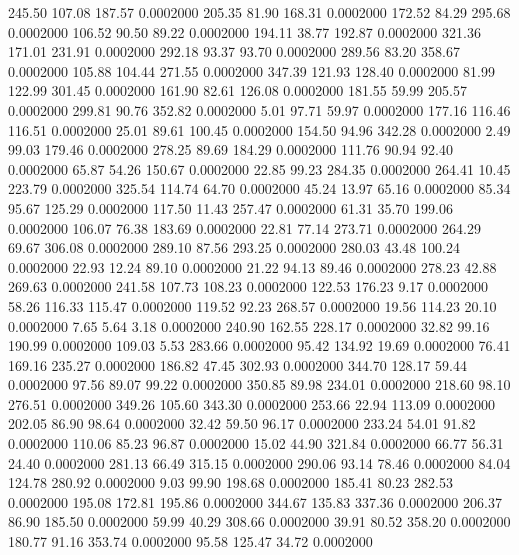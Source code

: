  245.50  107.08  187.57   0.0002000
 205.35   81.90  168.31   0.0002000
 172.52   84.29  295.68   0.0002000
 106.52   90.50   89.22   0.0002000
 194.11   38.77  192.87   0.0002000
 321.36  171.01  231.91   0.0002000
 292.18   93.37   93.70   0.0002000
 289.56   83.20  358.67   0.0002000
 105.88  104.44  271.55   0.0002000
 347.39  121.93  128.40   0.0002000
  81.99  122.99  301.45   0.0002000
 161.90   82.61  126.08   0.0002000
 181.55   59.99  205.57   0.0002000
 299.81   90.76  352.82   0.0002000
   5.01   97.71   59.97   0.0002000
 177.16  116.46  116.51   0.0002000
  25.01   89.61  100.45   0.0002000
 154.50   94.96  342.28   0.0002000
   2.49   99.03  179.46   0.0002000
 278.25   89.69  184.29   0.0002000
 111.76   90.94   92.40   0.0002000
  65.87   54.26  150.67   0.0002000
  22.85   99.23  284.35   0.0002000
 264.41   10.45  223.79   0.0002000
 325.54  114.74   64.70   0.0002000
  45.24   13.97   65.16   0.0002000
  85.34   95.67  125.29   0.0002000
 117.50   11.43  257.47   0.0002000
  61.31   35.70  199.06   0.0002000
 106.07   76.38  183.69   0.0002000
  22.81   77.14  273.71   0.0002000
 264.29   69.67  306.08   0.0002000
 289.10   87.56  293.25   0.0002000
 280.03   43.48  100.24   0.0002000
  22.93   12.24   89.10   0.0002000
  21.22   94.13   89.46   0.0002000
 278.23   42.88  269.63   0.0002000
 241.58  107.73  108.23   0.0002000
 122.53  176.23    9.17   0.0002000
  58.26  116.33  115.47   0.0002000
 119.52   92.23  268.57   0.0002000
  19.56  114.23   20.10   0.0002000
   7.65    5.64    3.18   0.0002000
 240.90  162.55  228.17   0.0002000
  32.82   99.16  190.99   0.0002000
 109.03    5.53  283.66   0.0002000
  95.42  134.92   19.69   0.0002000
  76.41  169.16  235.27   0.0002000
 186.82   47.45  302.93   0.0002000
 344.70  128.17   59.44   0.0002000
  97.56   89.07   99.22   0.0002000
 350.85   89.98  234.01   0.0002000
 218.60   98.10  276.51   0.0002000
 349.26  105.60  343.30   0.0002000
 253.66   22.94  113.09   0.0002000
 202.05   86.90   98.64   0.0002000
  32.42   59.50   96.17   0.0002000
 233.24   54.01   91.82   0.0002000
 110.06   85.23   96.87   0.0002000
  15.02   44.90  321.84   0.0002000
  66.77   56.31   24.40   0.0002000
 281.13   66.49  315.15   0.0002000
 290.06   93.14   78.46   0.0002000
  84.04  124.78  280.92   0.0002000
   9.03   99.90  198.68   0.0002000
 185.41   80.23  282.53   0.0002000
 195.08  172.81  195.86   0.0002000
 344.67  135.83  337.36   0.0002000
 206.37   86.90  185.50   0.0002000
  59.99   40.29  308.66   0.0002000
  39.91   80.52  358.20   0.0002000
 180.77   91.16  353.74   0.0002000
  95.58  125.47   34.72   0.0002000

